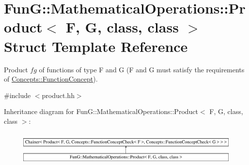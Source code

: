 \hypertarget{structFunG_1_1MathematicalOperations_1_1Product}{\section{Fun\-G\-:\-:Mathematical\-Operations\-:\-:Product$<$ F, G, class, class $>$ Struct Template Reference}
\label{structFunG_1_1MathematicalOperations_1_1Product}
}


Product $fg$ of functions of type F and G (F and G must satisfy the requirements of \hyperlink{structFunG_1_1Concepts_1_1FunctionConcept}{Concepts\-::\-Function\-Concept}).  




{\ttfamily \#include $<$product.\-hh$>$}

Inheritance diagram for Fun\-G\-:\-:Mathematical\-Operations\-:\-:Product$<$ F, G, class, class $>$\-:\begin{figure}[H]
\begin{center}
\leavevmode
\includegraphics[height=1.728395cm]{structFunG_1_1MathematicalOperations_1_1Product}
\end{center}
\end{figure}
